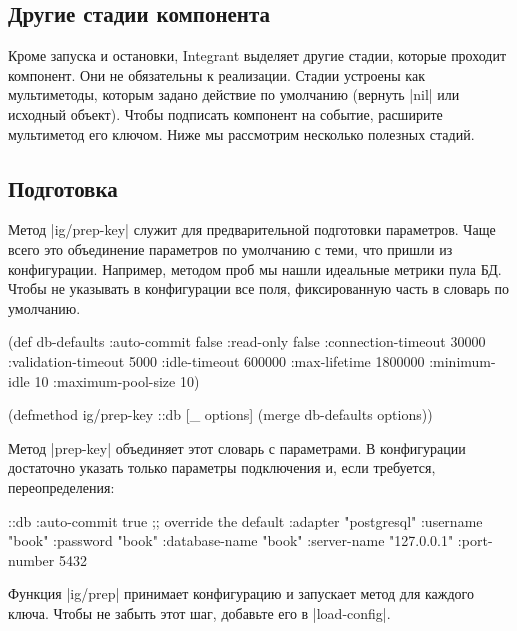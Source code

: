 \subsection{Другие стадии компонента}

Кроме запуска и остановки, Integrant выделяет другие стадии, которые
проходит компонент. Они не обязательны к реализации. Стадии устроены как
мультиметоды, которым задано действие по умолчанию (вернуть \spverb|nil| или
исходный объект). Чтобы подписать компонент на событие, расширите мультиметод
его ключом. Ниже мы рассмотрим несколько полезных стадий.

\subsection{Подготовка}

Метод \spverb|ig/prep-key| служит для предварительной подготовки
параметров. Чаще всего это объединение параметров по умолчанию с теми, что
пришли из конфигурации. Например, методом проб мы нашли идеальные метрики пула
БД. Чтобы не указывать в конфигурации все поля, фиксированную часть в словарь по
умолчанию.

\begin{english}
  \begin{clojure}
(def db-defaults
  {:auto-commit        false
   :read-only          false
   :connection-timeout 30000
   :validation-timeout 5000
   :idle-timeout       600000
   :max-lifetime       1800000
   :minimum-idle       10
   :maximum-pool-size  10})

(defmethod ig/prep-key ::db
  [_ options]
  (merge db-defaults options))
  \end{clojure}
\end{english}

Метод \spverb|prep-key| объединяет этот словарь с параметрами. В конфигурации
достаточно указать только параметры подключения и, если требуется,
переопределения:

\begin{english}
  \begin{clojure}
{::db {:auto-commit   true ;; override the default
       :adapter       "postgresql"
       :username      "book"
       :password      "book"
       :database-name "book"
       :server-name   "127.0.0.1"
       :port-number   5432}}
  \end{clojure}
\end{english}

Функция \spverb|ig/prep| принимает конфигурацию и запускает метод для каждого
ключа. Чтобы не забыть этот шаг, добавьте его в \spverb|load-config|.

